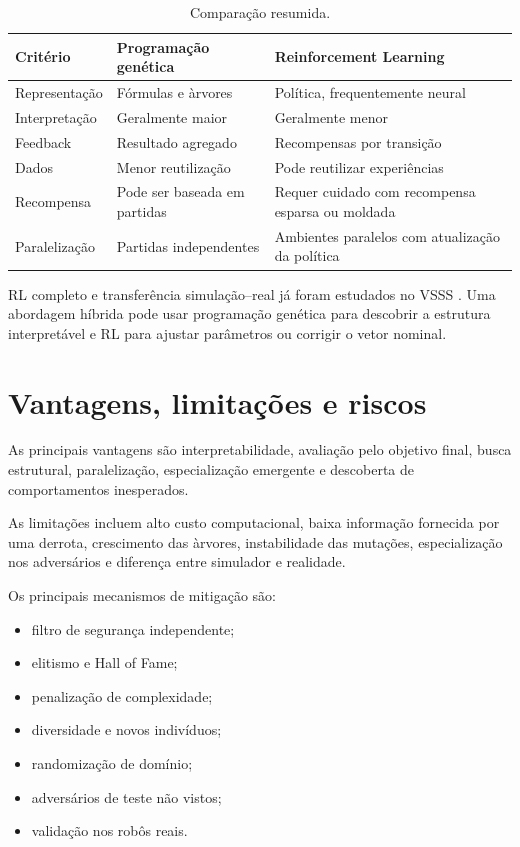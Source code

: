 \documentclass[12pt,a4paper]{article}
\begin{document}
\begin{table}[ht]
\centering
\caption{Compara\c{c}\~ao resumida.}
\begin{tabular}{p{3.1cm}p{5.2cm}p{5.2cm}}
\toprule
Crit\'erio & Programa\c{c}\~ao gen\'etica & Reinforcement Learning \\
\midrule
Representa\c{c}\~ao & F\'ormulas e \`arvores & Pol\'itica, frequentemente neural \\
Interpreta\c{c}\~ao & Geralmente maior & Geralmente menor \\
Feedback & Resultado agregado & Recompensas por transi\c{c}\~ao \\
Dados & Menor reutiliza\c{c}\~ao & Pode reutilizar experi\^encias \\
Recompensa & Pode ser baseada em partidas & Requer cuidado com recompensa esparsa ou moldada \\
Paraleliza\c{c}\~ao & Partidas independentes & Ambientes paralelos com atualiza\c{c}\~ao da pol\'itica \\
\bottomrule
\end{tabular}
\end{table}

RL completo e transfer\^encia simula\c{c}\~ao--real j\'a foram estudados no VSSS \cite{reis2020,maciel2021}. Uma abordagem h\'ibrida pode usar programa\c{c}\~ao gen\'etica para descobrir a estrutura interpret\'avel e RL para ajustar par\^ametros ou corrigir o vetor nominal.

\section{Vantagens, limita\c{c}\~oes e riscos}

As principais vantagens s\~ao interpretabilidade, avalia\c{c}\~ao pelo objetivo final, busca estrutural, paraleliza\c{c}\~ao, especializa\c{c}\~ao emergente e descoberta de comportamentos inesperados.

As limita\c{c}\~oes incluem alto custo computacional, baixa informa\c{c}\~ao fornecida por uma derrota, crescimento das \`arvores, instabilidade das muta\c{c}\~oes, especializa\c{c}\~ao nos advers\'arios e diferen\c{c}a entre simulador e realidade.

Os principais mecanismos de mitiga\c{c}\~ao s\~ao:

\begin{itemize}
  \item filtro de seguran\c{c}a independente;
  \item elitismo e Hall of Fame;
  \item penaliza\c{c}\~ao de complexidade;
  \item diversidade e novos indiv\'iduos;
  \item randomiza\c{c}\~ao de dom\'inio;
  \item advers\'arios de teste n\~ao vistos;
  \item valida\c{c}\~ao nos rob\^os reais.
\end{itemize}
\end{document}
